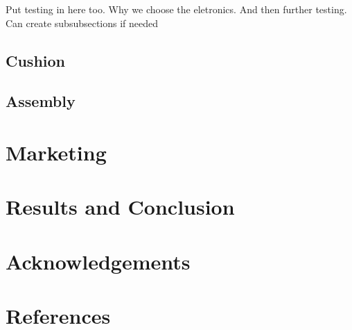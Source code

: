 \documentclass[a4paper]{article}
\begin{document}
Put testing in here too. Why we choose the eletronics. And then further testing. Can create subsubsections if needed
\subsection{Cushion}

\subsection{Assembly}

\section{Marketing}

\section{Results and Conclusion}

\section{Acknowledgements}

\section{References}
\end{document}
